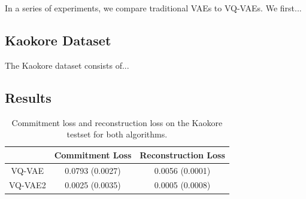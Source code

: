 \documentclass{article}
\begin{document}
In a series of experiments, we compare traditional VAEs to VQ-VAEs. We first...

\subsection{Kaokore Dataset}

The Kaokore dataset consists of...

\subsection{Results}

\begin{table}
    \centering
    \begin{tabular}{c c c}
        & Commitment Loss & Reconstruction Loss \\
        \hline
        VQ-VAE & 0.0793 (0.0027) & 0.0056 (0.0001) \\
        VQ-VAE2 & 0.0025 (0.0035) & 0.0005 (0.0008)
    \end{tabular}
    \caption{Commitment loss and reconstruction loss on the Kaokore testset for both algorithms.}
\end{table}
\end{document}
